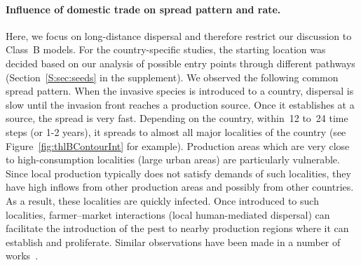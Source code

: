 \documentclass[11pt]{article}
\theoremstyle{definition}
\begin{document}
\paragraph{Influence of domestic trade on spread pattern and rate.}
Here, we focus on long-distance dispersal and therefore restrict our
discussion to Class~B models. For the country-specific studies, the
starting location was decided based on our analysis of possible entry
points through different pathways (Section~\ref{S:sec:seeds} in the
supplement).  We observed the following common spread pattern.  When the
invasive species is introduced to a country, dispersal is slow until the
invasion front reaches a {production source}. Once it establishes at a
source, the spread is very fast.  Depending on the country, within~12 to~24
time steps (or 1-2 years), it spreads to almost all major localities of
the country (see Figure~\ref{fig:thlBContourInt} for example). Production
areas which are very close to high-consumption localities (large urban
areas) are particularly vulnerable. Since local production typically does
not satisfy demands of such localities, they have high inflows from other
production areas and possibly from other countries. As a result, these
localities are quickly infected. Once introduced to such localities,
farmer--market interactions (local human-mediated dispersal) can facilitate
the introduction of the pest to nearby production regions where it can
establish and proliferate. Similar observations have been made in a number
of works~\cite{kiss2006network,pautasso2010disease}.
\end{document}
